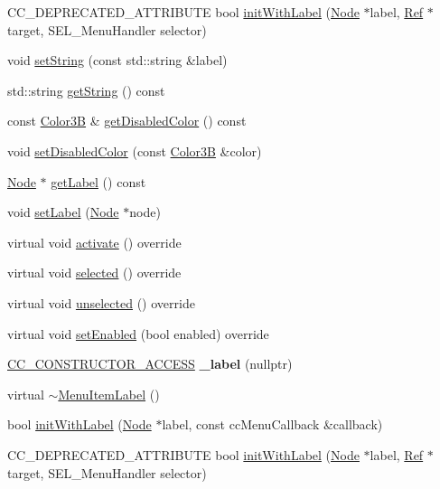 \begin{DoxyCompactItemize}
\item 
C\+C\+\_\+\+D\+E\+P\+R\+E\+C\+A\+T\+E\+D\+\_\+\+A\+T\+T\+R\+I\+B\+U\+TE bool \hyperlink{classMenuItemLabel_a2214307d26fb27b4c559bb9389198918}{init\+With\+Label} (\hyperlink{classNode}{Node} $\ast$label, \hyperlink{classRef}{Ref} $\ast$target, S\+E\+L\+\_\+\+Menu\+Handler selector)
\item 
void \hyperlink{classMenuItemLabel_a792525a9b4ca9f196bb670ec849b7e42}{set\+String} (const std\+::string \&label)
\item 
std\+::string \hyperlink{classMenuItemLabel_a8eb49b748631f0f68d85ab7e61eaa21d}{get\+String} () const
\item 
const \hyperlink{structColor3B}{Color3B} \& \hyperlink{classMenuItemLabel_acebe3d1c892af9ca9b8c495211160790}{get\+Disabled\+Color} () const
\item 
void \hyperlink{classMenuItemLabel_ae486baf2a29a1270b9b127fcbca33c3e}{set\+Disabled\+Color} (const \hyperlink{structColor3B}{Color3B} \&color)
\item 
\hyperlink{classNode}{Node} $\ast$ \hyperlink{classMenuItemLabel_a4e54f5c99e05377f183c6b8f3aec1f55}{get\+Label} () const
\item 
void \hyperlink{classMenuItemLabel_a7aacf61512ed43bff64aebcdd2e8e1c5}{set\+Label} (\hyperlink{classNode}{Node} $\ast$node)
\item 
virtual void \hyperlink{classMenuItemLabel_a6a5e8b0d94a07126c084ec1ba1695c13}{activate} () override
\item 
virtual void \hyperlink{classMenuItemLabel_a7c274195091bece411d64330754ea2e2}{selected} () override
\item 
virtual void \hyperlink{classMenuItemLabel_a1932cfa5621f3f8a9ce74f374aab04cd}{unselected} () override
\item 
virtual void \hyperlink{classMenuItemLabel_afec86371e192df5410720aeb94cbc12e}{set\+Enabled} (bool enabled) override
\item 
\mbox{\label{classMenuItemLabel_a4e87b6094fba446b1cffe0a4002f69ba}} 
\hyperlink{_2cocos2d_2cocos_2base_2ccConfig_8h_a25ef1314f97c35a2ed3d029b0ead6da0}{C\+C\+\_\+\+C\+O\+N\+S\+T\+R\+U\+C\+T\+O\+R\+\_\+\+A\+C\+C\+E\+SS} {\bfseries \+\_\+label} (nullptr)
\item 
virtual \hyperlink{classMenuItemLabel_af53a26705e5d33292ce79ba1c95c9c04}{$\sim$\+Menu\+Item\+Label} ()
\item 
bool \hyperlink{classMenuItemLabel_a3ef4f4b3d962dd6777a8840f5dda0473}{init\+With\+Label} (\hyperlink{classNode}{Node} $\ast$label, const cc\+Menu\+Callback \&callback)
\item 
C\+C\+\_\+\+D\+E\+P\+R\+E\+C\+A\+T\+E\+D\+\_\+\+A\+T\+T\+R\+I\+B\+U\+TE bool \hyperlink{classMenuItemLabel_a32ea4cd25efc973bc0452e62c2100c75}{init\+With\+Label} (\hyperlink{classNode}{Node} $\ast$label, \hyperlink{classRef}{Ref} $\ast$target, S\+E\+L\+\_\+\+Menu\+Handler selector)
\end{DoxyCompactItemize}
